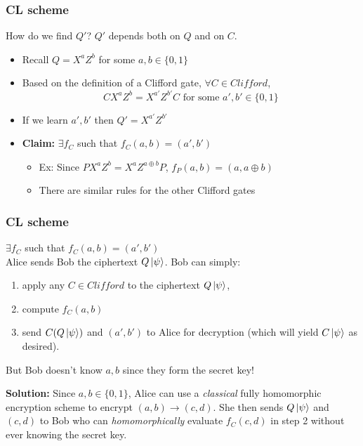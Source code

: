 \begin{frame}
\frametitle{CL scheme}
How do we find $Q'$? \pause
\vspace*{5mm}
$Q'$ depends both on $Q$ and on $C$.
\begin{itemize}
  \item Recall $Q = X^aZ^b$ for some $a,b \in \{0,1\}$ \pause
  \item Based on the definition of a Clifford gate, $\forall C \in Clifford$, \[ CX^aZ^b = X^{a'}Z^{b'}C \text{ for some } a',b' \in \{0,1\} \] \pause
  \item If we learn $a',b'$ then $Q' = X^{a'}Z^{b'}$ \pause
  \item \textbf{Claim:} $\exists f_C$ such that $f_C(a, b) = (a', b')$ \pause
  \begin{itemize}
     \item Ex: Since $PX^aZ^b = X^aZ^{a \oplus b}P$, \hspace*{5mm} $f_P(a,b) = (a, a \oplus b)$ \pause  
     \item There are similar rules for the other Clifford gates
  \end{itemize}  
\end{itemize}
\end{frame}
 
 
 \begin{frame}
\frametitle{CL scheme}
$\exists f_C$ such that $f_C(a, b) = (a', b')$ \\ \pause
Alice sends Bob the ciphertext $Q\left\vert{\psi}\right\rangle$. Bob can simply:
\begin{enumerate}
  \item apply any $C \in Clifford$ to the ciphertext $Q\left\vert{\psi}\right\rangle$, 
  \item compute $f_C(a,b)$
  \item send $C(Q\left\vert{\psi}\right\rangle)$ and $(a',b')$ to Alice for decryption (which will yield $C\left\vert{\psi}\right\rangle$ as desired). 
\end{enumerate} \pause
But Bob doesn't know $a,b$ since they form the secret key! \pause
\vspace*{5mm}

\textbf{Solution:} Since $a,b \in \{0,1\}$, Alice can use a \textit{classical} fully homomorphic encryption scheme to encrypt $(a,b) \rightarrow (c,d)$. She then sends $Q\left\vert{\psi}\right\rangle$ and $(c,d)$ to Bob who can \textit{homomorphically} evaluate $f_C(c,d)$ in step 2 without ever knowing the secret key. 
\end{frame}
 
